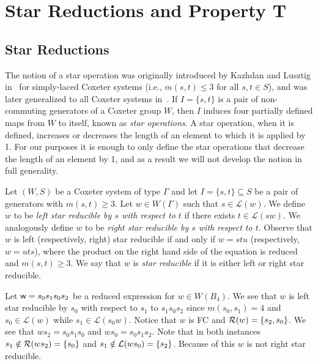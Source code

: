 \chapter{Star Reductions and Property T}


\section{Star Reductions}\label{sec:star}

The notion of a star operation was originally introduced by Kazhdan and Lusztig in~\cite{Kazhdan1979} for simply-laced Coxeter systems (i.e., $m(s,t) \leq 3$ for all $s,t \in S$), and was later generalized to all Coxeter systems in~\cite{Lusztig1985}. If $I=\{s,t\}$ is a pair of non-commuting generators of a Coxeter group $W$, then $I$ induces four partially defined maps from $W$ to itself, known as \emph{star operations}. A star operation, when it is defined, increases or decreases the length of an element to which it is applied by 1. For our purposes it is enough to only define the star operations that decrease the length of an element by 1, and as a result we will not develop the notion in full generality.

Let $(W,S)$ be a Coxeter system of type $\Gamma$ and let $I=\{s,t\}\subseteq S$ be a pair of generators with $m(s,t) \geq 3$. Let $w \in W(\Gamma)$ such that $s \in \mathcal{L}(w)$. We define $w$ to be \emph{left star reducible by $s$ with respect to $t$} if there exists $t \in \mathcal{L}(sw)$. We analogously define $w$ to be \emph{right star reducible by $s$ with respect to $t$}. Observe that $w$ is left (respectively, right) star reducible if and only if $w=stu$ (respectively, $w=uts$), where the product on the right hand side of the equation is reduced and $m(s,t) \geq 3$. We say that $w$ is \emph{star reducible} if it is either left or right star reducible.

\begin{example}\label{ex:starred}
Let $\mathsf{w}=s_0s_1s_0s_2$ be a reduced expression for $w \in W(B_4)$. We see that $w$ is left star reducible by $s_0$ with respect to $s_1$ to $s_1s_0s_2$ since $m(s_0,s_1)=4$ and $s_0 \in \mathcal{L}(w)$ while $s_1 \in \mathcal{L}(s_0w)$. Notice that $w$ is FC and $\mathcal{R}(w)=\{s_2,s_0\}$. We see that $ws_2=s_0s_1s_0$ and $ws_0=s_0s_1s_2$. Note that in both instances $s_1 \notin \mathcal{R}(ws_2)=\{s_0\}$ and $s_1 \notin \mathcal{L}(ws_0)=\{s_2\}$. Because of this $w$ is not right star reducible. 
\end{example}

